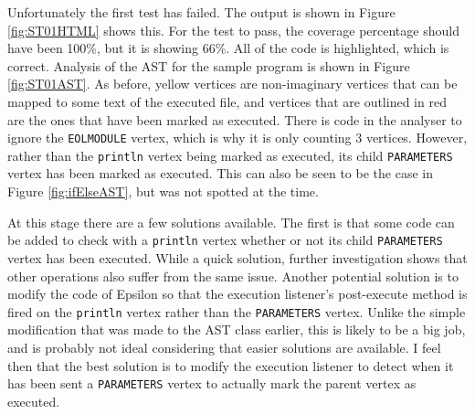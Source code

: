 Unfortunately the first test has failed. The output is shown in Figure \ref{fig:ST01HTML} shows this. For the test to pass, the coverage percentage should have been 100\%, but it is showing 66\%. All of the code is highlighted, which is correct. Analysis of the AST for the sample program is shown in Figure \ref{fig:ST01AST}. As before, yellow vertices are non-imaginary vertices that can be mapped to some text of the executed file, and vertices that are outlined in red are the ones that have been marked as executed. There is code in the analyser to ignore the \verb|EOLMODULE| vertex, which is why it is only counting 3 vertices. However, rather than the \verb|println| vertex being marked as executed, its child \verb|PARAMETERS| vertex has been marked as executed. This can also be seen to be the case in Figure \ref{fig:ifElseAST}, but was not spotted at the time. 

At this stage there are a few solutions available. The first is that some code can be added to check with a \verb|println| vertex whether or not its child \verb|PARAMETERS| vertex has been executed. While a quick solution, further investigation shows that other operations also suffer from the same issue. Another potential solution is to modify the code of Epsilon so that the execution listener's post-execute method is fired on the \verb|println| vertex rather than the \verb|PARAMETERS| vertex. Unlike the simple modification that was made to the AST class earlier, this is likely to be a big job, and is probably not ideal considering that easier solutions are available. I feel then that the best solution is to modify the execution listener to detect when it has been sent a \verb|PARAMETERS| vertex to actually mark the parent vertex as executed.

